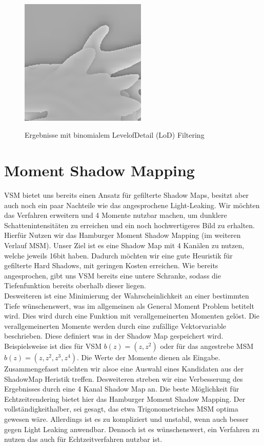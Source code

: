 \documentclass[runningheaders,a4paper]{llncs}
\begin{document}
\begin{figure}[H]
{		\includegraphics[width = 6cm]{vo_assets/area/zoomed/shinyMMFilter_on1.png}
		\label{ref:SBMF_on_close}
	}
	\caption{Ergebnisse mit binomialem LevelofDetail (LoD) Filtering}
	\label{ref:SBMF}
\end{figure}

\section{Moment Shadow Mapping}
VSM bietet uns bereits einen Ansatz für gefilterte Shadow Maps, besitzt aber auch noch ein paar Nachteile wie das angesprochene Light-Leaking. Wir möchten das Verfahren erweitern und 4 Momente nutzbar machen, um dunklere Schattenintensitäten zu erreichen und ein noch hochwertigeres Bild zu erhalten.\\
Hierfür Nutzen wir das Hamburger Moment Shadow Mapping (im weiteren Verlauf MSM).
Unser Ziel ist es eine Shadow Map mit 4 Kanälen zu nutzen, welche jeweils 16bit haben. Dadurch möchten wir eine gute Heuristik für gefilterte Hard Shadows, mit geringen Kosten erreichen. Wie bereits angesprochen, gibt uns VSM bereits eine untere Schranke, sodass die Tiefenfunktion bereits oberhalb dieser liegen.\\
Desweiteren ist eine Minimierung der Wahrscheinlichkeit an einer bestimmten Tiefe wünschenswert, was im allgemeinen als General Moment Problem betitelt wird.
Dies wird durch eine Funktion mit verallgemeinerten Momenten gelöst. Die verallgemeinerten Momente werden durch eine zufällige Vektorvariable beschrieben. Diese definiert was in der Shadow Map gespeichert wird. Beispielsweise ist dies für VSM $b(z) = (z,z^2)$ oder für das angestrebe MSM $b(z) = (z,z^2,z^3,z^4)$. Die Werte der Momente dienen als Eingabe.\\
Zusammengefasst möchten wir alsoe eine Auswahl eines Kandidaten aus der ShadowMap Heristik treffen. Desweiteren streben wir eine Verbesserung des Ergebnisses durch eine 4 Kanal Shadow Map an. Die beste Möglichkeit für Echtzeitrendering bietet hier das Hamburger Moment Shadow Mapping. Der vollständigkeithalber, sei gesagt, das etwa Trigonometrisches MSM optima gewesen wäre. Allerdings ist es zu kompliziert und unstabil, wenn auch besser gegen Light Leaking anwendbar. Dennoch ist es wünschenswert, ein Verfahren zu nutzen das auch für Echtzeitverfahren nutzbar ist.\cite{msm}\\
\end{document}

